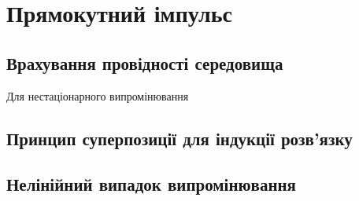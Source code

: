 \chapter{Прямокутний імпульс}
\label{ch:evolution}

\section{Врахування провідності середовища}

Для нестаціонарного випромінювання

\section{Принцип суперпозиції для індукції розв'язку}

\section{Нелінійний випадок випромінювання}
